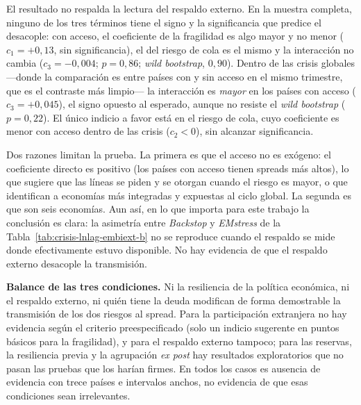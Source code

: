 El resultado no respalda la lectura del respaldo externo. En la muestra completa, ninguno de los tres términos tiene el signo y la significancia que predice el desacople: con acceso, el coeficiente de la fragilidad es algo mayor y no menor ($c_1=+0{,}13$, sin significancia), el del riesgo de cola es el mismo y la interacción no cambia ($c_3=-0{,}004$; $p=0{,}86$; \textit{wild bootstrap}, $0{,}90$). Dentro de las crisis globales ---donde la comparación es entre países con y sin acceso en el mismo trimestre, que es el contraste más limpio--- la interacción es \emph{mayor} en los países con acceso ($c_3=+0{,}045$), el signo opuesto al esperado, aunque no resiste el \textit{wild bootstrap} ($p=0{,}22$). El único indicio a favor está en el riesgo de cola, cuyo coeficiente es menor con acceso dentro de las crisis ($c_2<0$), sin alcanzar significancia.

Dos razones limitan la prueba. La primera es que el acceso no es exógeno: el coeficiente directo es positivo (los países con acceso tienen spreads más altos), lo que sugiere que las líneas se piden y se otorgan cuando el riesgo es mayor, o que identifican a economías más integradas y expuestas al ciclo global. La segunda es que son seis economías. Aun así, en lo que importa para este trabajo la conclusión es clara: la asimetría entre \textit{Backstop} y \textit{EMstress} de la Tabla~\ref{tab:crisis-lnlag-embiext-b} no se reproduce cuando el respaldo se mide donde efectivamente estuvo disponible. No hay evidencia de que el respaldo externo desacople la transmisión.

\textbf{Balance de las tres condiciones.} Ni la resiliencia de la política económica, ni el respaldo externo, ni quién tiene la deuda modifican de forma demostrable la transmisión de los dos riesgos al spread. Para la participación extranjera no hay evidencia según el criterio preespecificado (solo un indicio sugerente en puntos básicos para la fragilidad), y para el respaldo externo tampoco; para las reservas, la resiliencia previa y la agrupación \textit{ex post} hay resultados exploratorios que no pasan las pruebas que los harían firmes. En todos los casos es ausencia de evidencia con trece países e intervalos anchos, no evidencia de que esas condiciones sean irrelevantes.
